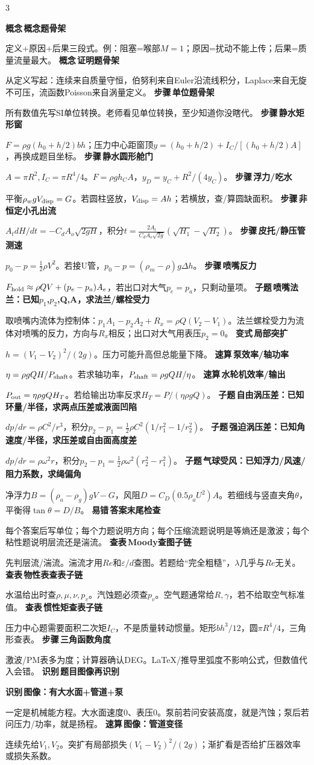 \documentclass[a4paper]{article}
\newcommand{\labtag}[3]{{\bfseries\color{#1}\colorbox{#1}{\color{white}\fontsize{2.35}{2.48}\selectfont #2}\,#3}\par}
\newcommand{\subt}[1]{\labtag{Q}{子题}{#1}}
\newcommand{\var}[1]{\labtag{V}{变式}{#1}}
\newcommand{\iden}[1]{\labtag{C}{识别}{#1}}
\newcommand{\step}[1]{\labtag{S}{步骤}{#1}}
\newcommand{\err}[1]{\labtag{R}{易错}{#1}}
\newcommand{\lookup}[1]{\labtag{C}{查表}{#1}}
\newcommand{\concept}[1]{\labtag{V}{概念}{#1}}
\newcommand{\miniimg}[2]{}
\newcommand{\subq}[1]{\subt{#1}}
\newcommand{\varq}[1]{\var{#1}}
\newcommand{\idq}[1]{\iden{#1}}
\newcommand{\stepq}[1]{\step{#1}}
\newcommand{\errq}[1]{\err{#1}}
\newcommand{\lookq}[1]{\lookup{#1}}
\newcommand{\conceptq}[1]{\concept{#1}}
\newcommand{\quickq}[1]{\labtag{F}{速算}{#1}}
\newenvironment{vfourWrap}{\par\begingroup\fontsize{2.68}{2.84}\selectfont\setlength{\fboxsep}{0.45pt}}{\par\endgroup}
\begin{document}
\begin{multicols}{3}
\begin{vfourWrap}
\conceptq{概念题骨架}
定义+原因+后果三段式。例：阻塞=喉部$M=1$；原因=扰动不能上传；后果=质量流量最大。
\conceptq{证明题骨架}
从定义写起：连续来自质量守恒，伯努利来自Euler沿流线积分，Laplace来自无旋不可压，流函数Poisson来自涡量定义。
\stepq{单位题骨架}
所有数值先写SI单位转换。老师看见单位转换，至少知道你没瞎代。
\stepq{静水矩形窗}
$F=\rho g(h_0+h/2)bh$；压力中心距窗顶$y=(h_0+h/2)+I_C/[(h_0+h/2)A]$，再换成题目坐标。
\stepq{静水圆形舱门}
$A=\pi R^2,I_C=\pi R^4/4$。$F=\rho gh_CA$，$y_D=y_C+R^2/(4y_C)$。
\stepq{浮力/吃水}
平衡$\rho_w gV_{\rm disp}=G$。若圆柱竖放，$V_{\rm disp}=Ah$；若横放，查/算圆缺面积。
\stepq{非恒定小孔出流}
$A_t dH/dt=-C_dA_o\sqrt{2gH}$，积分$t=\frac{2A_t}{C_dA_o\sqrt{2g}}(\sqrt{H_1}-\sqrt{H_2})$。
\stepq{皮托/静压管测速}
$p_0-p=\frac12\rho V^2$。若接U管，$p_0-p=(\rho_m-\rho)g\Delta h$。
\stepq{喷嘴反力}
$F_{\rm hold}\approx\rho QV+(p_e-p_a)A_e$，若出口对大气$p_e=p_a$，只剩动量项。
\subq{喷嘴法兰：已知$p_1$,$p_2$,Q,A，求法兰/螺栓受力}
取喷嘴内流体为控制体：$p_1A_1-p_2A_2+R_x=\rho Q(V_2-V_1)$。法兰螺栓受力为流体对喷嘴的反力，方向与$R_x$相反；出口对大气用表压$p_2=0$。
\varq{局部突扩}
$h=(V_1-V_2)^2/(2g)$。压力可能升高但总能量下降。
\quickq{泵效率/轴功率}
$\eta=\rho gQH/P_{\rm shaft}$。若求轴功率，$P_{\rm shaft}=\rho gQH/\eta$。
\quickq{水轮机效率/输出}
$P_{\rm out}=\eta\rho gQH_T$。若给输出功率反求$H_T=P/(\eta\rho gQ)$。
\subq{自由涡压差：已知环量/半径，求两点压差或液面凹陷}
$dp/dr=\rho C^2/r^3$，积分$p_2-p_1=\frac12\rho C^2(1/r_1^2-1/r_2^2)$。
\subq{强迫涡压差：已知角速度/半径，求压差或自由面高度差}
$dp/dr=\rho\omega^2r$，积分$p_2-p_1=\frac12\rho\omega^2(r_2^2-r_1^2)$。
\subq{气球受风：已知浮力/风速/阻力系数，求绳偏角}
净浮力$B=(\rho_a-\rho_g)gV-G$，风阻$D=C_D(0.5\rho_aU^2)A$。若细线与竖直夹角$\theta$，平衡得$\tan\theta=D/B$。
\errq{答案末尾检查}
每个答案后写单位；每个力题说明方向；每个压缩流题说明是等熵还是激波；每个粘性题说明层流还是湍流。
\lookq{Moody查图子链}
先判层流/湍流。湍流才用$Re$和$\varepsilon/d$查图。若题给“完全粗糙”，$\lambda$几乎与$Re$无关。
\lookq{物性表查表子链}
水温给出时查$\rho,\mu,\nu,p_v$。汽蚀题必须查$p_v$。空气题通常给$R,\gamma$，若不给取空气标准值。
\lookq{惯性矩查表子链}
压力中心题需要面积二次矩$I_C$，不是质量转动惯量。矩形$bh^3/12$，圆$\pi R^4/4$，三角形查表。
\stepq{三角函数角度}
激波/PM表多为度；计算器确认DEG。LaTeX/推导里弧度不影响公式，但数值代入会错。
\idq{题目图像再识别}
\miniimg{0.98}{assets/original_problem_schematics_generic.png}
\idq{图像：有大水面+管道+泵}
一定是机械能方程。大水面速度0、表压0。泵前若问安装高度，就是汽蚀；泵后若问压力/功率，就是扬程。
\quickq{图像：管道变径}
连续先给$V_1,V_2$。突扩有局部损失$(V_1-V_2)^2/(2g)$；渐扩看是否给扩压器效率或损失系数。

\end{vfourWrap}
\end{multicols}
\end{document}
